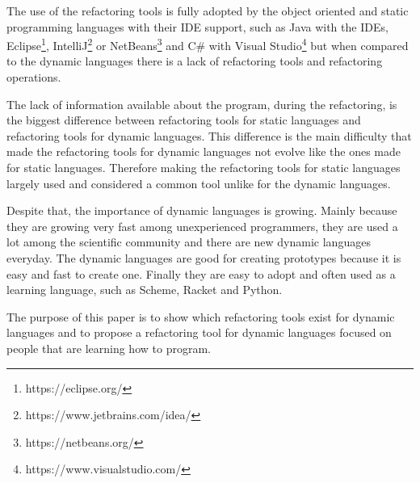 The use of the refactoring tools is fully adopted by the object oriented and static programming languages with their IDE support, such as Java with the IDEs, Eclipse\footnote{https://eclipse.org/}, IntelliJ\footnote{https://www.jetbrains.com/idea/} or NetBeans\footnote{https://netbeans.org/} and C\# with Visual Studio\footnote{https://www.visualstudio.com/} but when %
compared to the dynamic languages there is a lack of refactoring tools and refactoring operations.

The lack of information available about the program, during the refactoring, is the biggest difference between refactoring tools for static languages and refactoring tools for dynamic languages.
This difference is the main difficulty that made the refactoring tools for dynamic languages not evolve like the ones made for static languages. 
Therefore making the refactoring tools for static languages largely used and considered a common tool unlike for the dynamic languages.  %

Despite that, the importance of dynamic languages is growing. Mainly because they are growing very fast among unexperienced programmers, they are used a lot among the scientific community and there are new dynamic languages everyday. 
The dynamic languages are good for creating prototypes because it is easy and fast to create one. Finally they are easy to adopt and often used as a learning language, such as Scheme, Racket and Python. %


The purpose of this paper is to show which refactoring tools exist for dynamic languages and to propose a refactoring tool for dynamic languages focused on people that are learning how to program. %







